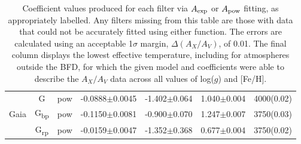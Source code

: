 \documentclass[12pt, a4paper]{report}
\begin{document}
\begin{table}
\begin{center}
{\begin{tabular}{ccccccc}
& G & pow & -0.0888$\pm$0.0045 & -1.402$\pm$0.064 & 1.040$\pm$0.004 & 4000(0.02) \\
Gaia & G\textsubscript{bp} & pow & -0.1150$\pm$0.0081 & -0.900$\pm$0.070 & 1.247$\pm$0.007 & 3750(0.03) \\
& G\textsubscript{rp} & pow & -0.0159$\pm$0.0047 & -1.352$\pm$0.368 & 0.677$\pm$0.004 & 3750(0.02) \\ \hline

\end{tabular}}
\caption{Coefficient values produced for each filter via $A_{\textnormal{exp}}$ or $A_{\textnormal{pow}}$ fitting, as appropriately labelled. Any filters missing from this table are those with data that could not be accurately fitted using either function. The errors are calculated using an acceptable 1$\sigma$ margin, $\Delta(A_{X}/A_{V})$, of 0.01. The final column displays the lowest effective temperature, including for atmospheres outside the BFD, for which the given model and coefficients were able to describe the $A_{X}/A_{V}$ data across all values of log($g$) and [Fe/H].}
\label{simpfunc_coeffs_table}
\end{center}
\end{table}
\end{document}
